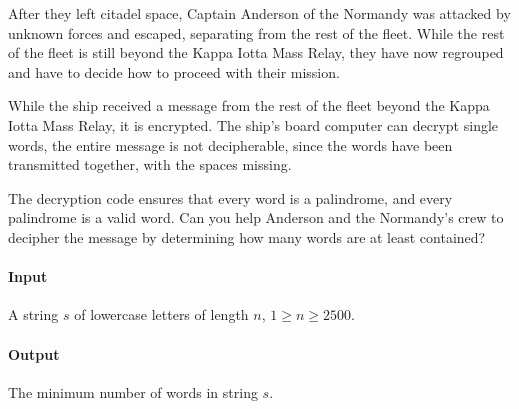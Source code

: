 



\makeheader

After they left citadel space, Captain Anderson of the Normandy was attacked by unknown forces and escaped, separating from the rest of the fleet. While the rest of the fleet is still beyond the Kappa Iotta Mass Relay, they have now regrouped and have to decide how to proceed with their mission.

While the ship received a message from the rest of the fleet beyond the Kappa Iotta Mass Relay, it is encrypted. The ship's board computer can decrypt single words, the entire message is not decipherable, since the words have been transmitted together, with the spaces missing.

The decryption code ensures that every word is a palindrome, and every palindrome is a valid word. Can you help Anderson and the Normandy's crew to decipher the message by determining how many words are at least contained?

\paragraph*{Input}

A string $s$ of lowercase letters of length $n$, $1 \geq n \geq 2500$.

\paragraph*{Output}

The minimum number of words in string $s$.

\begin{samples}
\end{samples}

